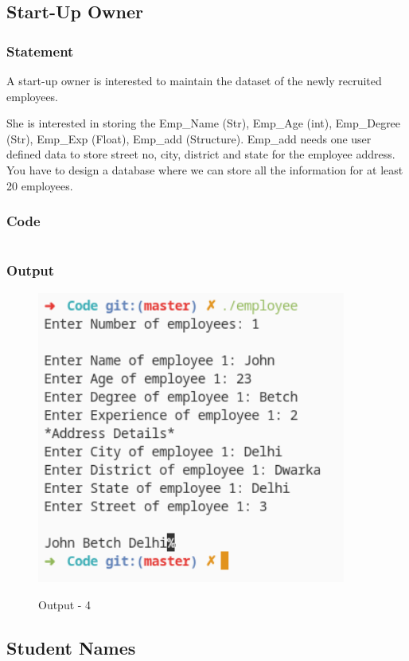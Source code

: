 \pagebreak
\subsection{Start-Up Owner}

\subsubsection{Statement}
A start-up owner is interested to maintain the dataset of the newly recruited employees.

She is interested in storing the Emp\_Name (Str), Emp\_Age (int), Emp\_Degree (Str), Emp\_Exp
(Float), Emp\_add (Structure). Emp\_add needs one user defined data to store street no, city,
district and state for the employee address. You have to design a database where we can store all
the information for at least 20 employees.

\subsubsection{Code}
\inputminted[]{c}{../Code/employee.cpp}
\pagebreak
\subsubsection{Output}
\begin{figure}[!htb]
  \centering
  \includegraphics[width=4in]{Images/employee.png}
  \label{Output-4}
  \caption{Output - 4}
\end{figure}


\pagebreak
\subsection{Student Names}

